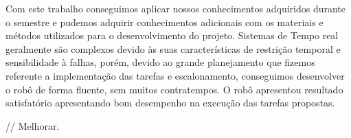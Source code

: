 Com este trabalho conseguimos aplicar nossos conhecimentos adquiridos durante o semestre e pudemos adquirir conhecimentos adicionais com os materiais e métodos utilizados para o desenvolvimento do projeto.  Sistemas de Tempo real geralmente são complexos devido às suas características de restrição temporal e sensibilidade à falhas, porém, devido ao grande planejamento que fizemos referente a implementação das tarefas e escalonamento, conseguimos desenvolver o robô de forma fluente, sem muitos contratempos. O robô apresentou resultado satisfatório apresentando bom desempenho na execução das tarefas propostas.

// Melhorar.
